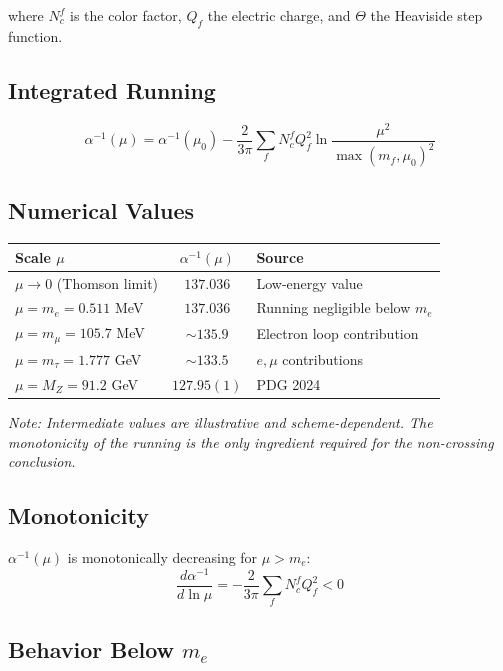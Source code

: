 \documentclass[11pt,a4paper]{article}
\begin{document}
where $N_c^f$ is the color factor, $Q_f$ the electric charge, and $\Theta$ the Heaviside step function.

\subsection{Integrated Running}

\begin{equation}
\alpha^{-1}(\mu) = \alpha^{-1}(\mu_0) - \frac{2}{3\pi} \sum_f N_c^f Q_f^2 \ln\frac{\mu^2}{\max(m_f, \mu_0)^2}
\end{equation}

\subsection{Numerical Values}

\begin{center}
\begin{tabular}{|l|c|l|}
\hline
Scale $\mu$ & $\alpha^{-1}(\mu)$ & Source \\
\hline
$\mu \to 0$ (Thomson limit) & $137.036$ & Low-energy value \\
$\mu = m_e = 0.511$ MeV & $137.036$ & Running negligible below $m_e$ \\
$\mu = m_\mu = 105.7$ MeV & $\sim 135.9$ & Electron loop contribution \\
$\mu = m_\tau = 1.777$ GeV & $\sim 133.5$ & $e, \mu$ contributions \\
$\mu = M_Z = 91.2$ GeV & $127.95(1)$ & PDG 2024 \\
\hline
\end{tabular}
\end{center}

\textit{Note: Intermediate values are illustrative and scheme-dependent. The monotonicity of the running is the only ingredient required for the non-crossing conclusion.}

\subsection{Monotonicity}

$\alpha^{-1}(\mu)$ is monotonically decreasing for $\mu > m_e$:
\begin{equation}
\frac{d\alpha^{-1}}{d\ln\mu} = -\frac{2}{3\pi} \sum_f N_c^f Q_f^2 < 0
\end{equation}

\subsection{Behavior Below $m_e$}
\end{document}

